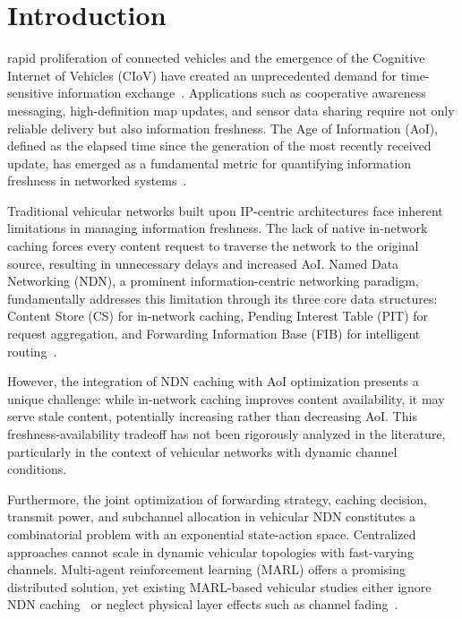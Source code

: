 \documentclass[journal]{IEEEtran}
\begin{document}
\section{Introduction} \label{sec:introduction}

 rapid proliferation of connected vehicles and the emergence of the Cognitive Internet of Vehicles (CIoV) have created an unprecedented demand for time-sensitive information exchange~\cite{Lim2024, Khan2024}. Applications such as cooperative awareness messaging, high-definition map updates, and sensor data sharing require not only reliable delivery but also information freshness. The Age of Information (AoI), defined as the elapsed time since the generation of the most recently received update, has emerged as a fundamental metric for quantifying information freshness in networked systems~\cite{Kaul2012, Sun2019}.

Traditional vehicular networks built upon IP-centric architectures face inherent limitations in managing information freshness. The lack of native in-network caching forces every content request to traverse the network to the original source, resulting in unnecessary delays and increased AoI. Named Data Networking (NDN), a prominent information-centric networking paradigm, fundamentally addresses this limitation through its three core data structures: Content Store (CS) for in-network caching, Pending Interest Table (PIT) for request aggregation, and Forwarding Information Base (FIB) for intelligent routing~\cite{Dhara2023, Wang2024a, Silva2024}.

However, the integration of NDN caching with AoI optimization presents a unique challenge: while in-network caching improves content availability, it may serve stale content, potentially increasing rather than decreasing AoI. This freshness-availability tradeoff has not been rigorously analyzed in the literature, particularly in the context of vehicular networks with dynamic channel conditions.

Furthermore, the joint optimization of forwarding strategy, caching decision, transmit power, and subchannel allocation in vehicular NDN constitutes a combinatorial problem with an exponential state-action space. Centralized approaches cannot scale in dynamic vehicular topologies with fast-varying channels. Multi-agent reinforcement learning (MARL) offers a promising distributed solution, yet existing MARL-based vehicular studies either ignore NDN caching~\cite{Ning2024} or neglect physical layer effects such as channel fading~\cite{Wang2024c}.
\end{document}
